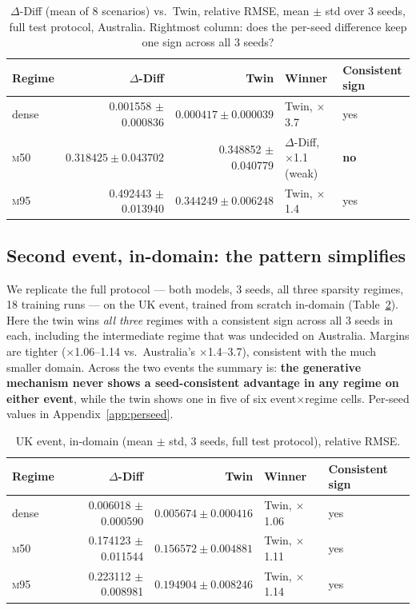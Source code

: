 \documentclass[11pt]{article}
\newcommand{\ours}{\mbox{$\Delta$-Diff}}
\newcommand{\twin}{\mbox{Twin}}
\newcommand{\mfifty}{\textsc{m50}}
\newcommand{\mninetyfive}{\textsc{m95}}
\begin{document}
\begin{table}[H]
\centering
\caption{\ours{} (mean of 8 scenarios) vs.\ \twin{}, relative RMSE, mean
$\pm$ std over 3 seeds, full test protocol, Australia. Rightmost column:
does the per-seed difference keep one sign across all 3 seeds?}
\label{tab:twinresults}
\begin{tabular}{lrrll}
\toprule
Regime & \ours{} & \twin{} & Winner & Consistent sign \\
\midrule
dense & 0.001558 $\pm$ 0.000836 & $\mathbf{0.000417 \pm 0.000039}$ & \twin{}, $\times$3.7 & yes \\
\mfifty{} & $\mathbf{0.318425 \pm 0.043702}$ & 0.348852 $\pm$ 0.040779 & \ours{}, $\times$1.1 (weak) & \textbf{no} \\
\mninetyfive{} & 0.492443 $\pm$ 0.013940 & $\mathbf{0.344249 \pm 0.006248}$ & \twin{}, $\times$1.4 & yes \\
\bottomrule
\end{tabular}
\end{table}
\FloatBarrier

\subsection{Second event, in-domain: the pattern simplifies}
\label{sec:ukresults}
We replicate the full protocol --- both models, 3 seeds, all three
sparsity regimes, 18 training runs --- on the UK event, trained from
scratch in-domain (Table~\ref{tab:ukresults}). Here the twin wins
\emph{all three} regimes with a consistent sign across all 3 seeds in
each, including the intermediate regime that was undecided on Australia.
Margins are tighter ($\times$1.06--1.14 vs.\ Australia's
$\times$1.4--3.7), consistent with the much smaller domain. Across the
two events the summary is: \textbf{the generative mechanism never shows a
seed-consistent advantage in any regime on either event}, while the twin
shows one in five of six event$\times$regime cells. Per-seed values in
Appendix~\ref{app:perseed}.

\begin{table}[H]
\centering
\caption{UK event, in-domain (mean $\pm$ std, 3 seeds, full test
protocol), relative RMSE.}
\label{tab:ukresults}
\begin{tabular}{lrrll}
\toprule
Regime & \ours{} & \twin{} & Winner & Consistent sign \\
\midrule
dense & 0.006018 $\pm$ 0.000590 & $\mathbf{0.005674 \pm 0.000416}$ & \twin{}, $\times$1.06 & yes \\
\mfifty{} & 0.174123 $\pm$ 0.011544 & $\mathbf{0.156572 \pm 0.004881}$ & \twin{}, $\times$1.11 & yes \\
\mninetyfive{} & 0.223112 $\pm$ 0.008981 & $\mathbf{0.194904 \pm 0.008246}$ & \twin{}, $\times$1.14 & yes \\
\bottomrule
\end{tabular}
\end{table}
\end{document}
